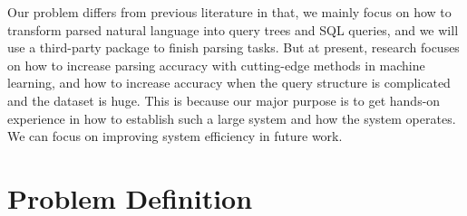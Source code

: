 \documentclass[twocolumn]{article}
\begin{document}
\begin{itemize}
	Our problem differs from previous literature in that, we mainly focus on how to transform parsed natural language into query trees and SQL queries, and we will use a third-party package to finish parsing tasks. But at present, research focuses on how to increase parsing accuracy with cutting-edge methods in machine learning, and how to increase accuracy when the query structure is complicated and the dataset is huge. This is because our major purpose is to get hands-on experience in how to establish such a large system and how the system operates. We can focus on improving system efficiency in future work.\\
\end{itemize}


\section{Problem Definition}
\end{document}
